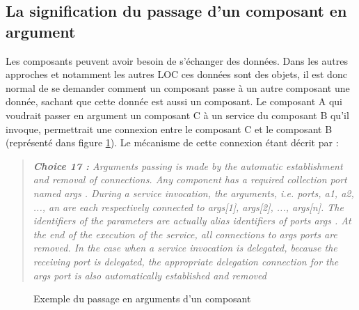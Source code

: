   
  \label{sec:argumentscomposants}
  
  \subsection{La signification du passage d'un composant en argument}
  
  Les composants peuvent avoir besoin de s'échanger des données. Dans les autres approches et notamment les autres LOC ces données sont des objets, il est donc normal de se demander comment un composant passe à un autre composant une donnée, sachant que cette donnée est aussi un composant. Le composant A qui voudrait passer en argument un composant C à un service du composant B qu'il invoque, permettrait une connexion entre le composant C et le composant B (représenté dans figure \ref{fig:archiCompo}). Le mécanisme de cette connexion étant décrit par \cite{Spacek:2014:CMA:2602458.2602476} : 
  
  \begin{quote}
      \emph{\textbf{Choice 17 : }Arguments passing is made by the automatic establishment and removal of connections. Any component has a required collection port named args . During a service invocation, the arguments, i.e. ports, {a1, a2, ..., an} are each respectively connected to {args[1], args[2], ..., args[n]}. The identifiers of the parameters are actually alias identifiers of ports args . At the end of the execution of the service, all connections to args ports are removed. In the case when a service invocation is delegated, because the receiving port is delegated, the appropriate delegation connection for the args port is also automatically established and removed} 
  \end{quote}
  
\begin{figure}[!t]
\centering
{}
\caption{Exemple du passage en arguments d'un composant}
\label{fig:archiCompo}
\end{figure}
  
